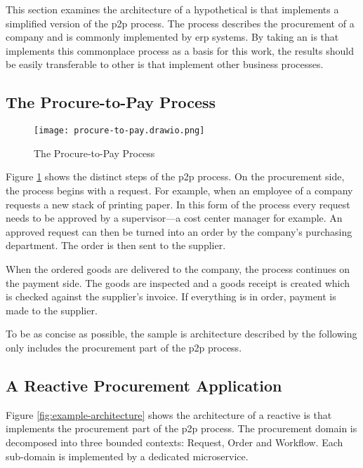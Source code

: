 This section examines the architecture of a hypothetical \gls{is} that implements a simplified version of the \gls{p2p} process.
The process describes the procurement of a company and is commonly implemented by \gls{erp} systems.
By taking an \gls{is} that implements this commonplace process as a basis for this work, the results should be easily transferable to other \gls{is} that implement other business processes.

\subsection{The Procure-to-Pay Process}

\begin{figure}[H]
  \centering
  \texttt{[image: procure-to-pay.drawio.png]}
  \caption{The Procure-to-Pay Process}\label{fig:procure-to-pay}
\end{figure}

Figure \ref{fig:procure-to-pay} shows the distinct steps of the \gls{p2p} process.
On the procurement side, the process begins with a request.
For example, when an employee of a company requests a new stack of printing paper.
In this form of the process every request needs to be approved by a supervisor---a cost center manager for example.
An approved request can then be turned into an order by the company's purchasing department.
The order is then sent to the supplier.

When the ordered goods are delivered to the company, the process continues on the payment side.
The goods are inspected and a goods receipt is created which is checked against the supplier's invoice.
If everything is in order, payment is made to the supplier.

To be as concise as possible, the sample \gls{is} architecture described by the following only includes the procurement part of the \gls{p2p} process.

\subsection{A Reactive Procurement Application}

Figure \ref{fig:example-architecture} shows the architecture of a reactive \gls{is} that implements the procurement part of the \gls{p2p} process.
The procurement domain is decomposed into three bounded contexts: Request, Order and Workflow.
Each sub-domain is implemented by a dedicated microservice.

